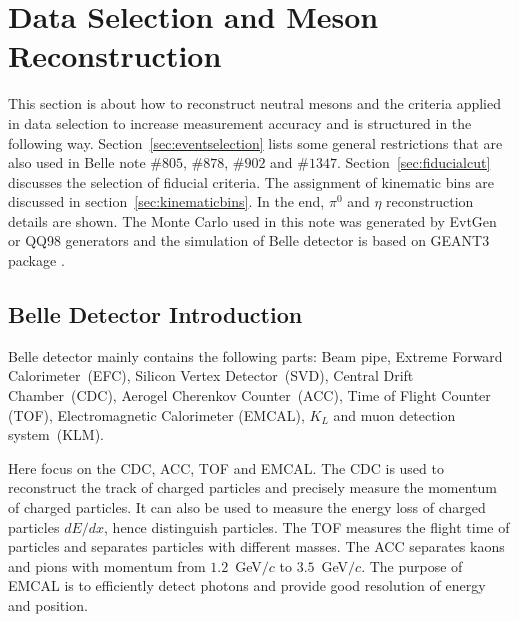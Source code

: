 \section{Data Selection and Meson Reconstruction}
\label{sec:dataselection}
This section is about how to reconstruct neutral mesons and the criteria applied in data selection to increase measurement accuracy and is structured in the following way. Section~\ref{sec:eventselection} lists some general restrictions that are also used in Belle note $\#805$, $\#878$, $\#902$ and $\#1347$. Section~\ref{sec:fiducialcut} discusses the selection of fiducial criteria. The assignment of kinematic bins are discussed in section~\ref{sec:kinematicbins}. In the end, $\pi^0$ and $\eta$ reconstruction details are shown. The Monte Carlo used in this note was generated by EvtGen or QQ98 generators and the simulation of Belle detector is based on GEANT3 package \cite{DetectorSimulation}. 

\subsection{Belle Detector Introduction}
Belle detector mainly contains the following parts: Beam pipe, Extreme Forward Calorimeter~(EFC), Silicon Vertex Detector~(SVD), Central Drift Chamber~(CDC), Aerogel Cherenkov Counter~(ACC), Time of Flight Counter (TOF), Electromagnetic Calorimeter (EMCAL), $K_L$ and muon detection system~(KLM).
 
Here focus on the CDC, ACC, TOF and EMCAL. The CDC is used to reconstruct the track of charged particles and precisely measure the momentum of charged particles. It can also be used to measure the energy loss of charged particles $dE/dx$, hence distinguish particles. The TOF measures the flight time of particles and separates particles with different masses. The ACC separates kaons and pions with momentum from $1.2$~GeV$/c$ to $3.5$~GeV$/c$. The purpose of EMCAL is to efficiently detect photons and provide good resolution of energy and position. 


